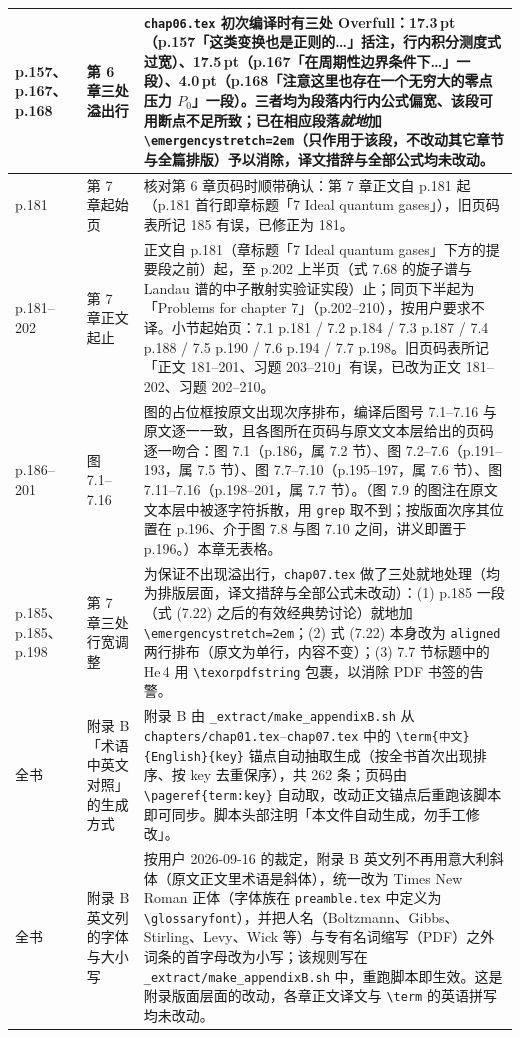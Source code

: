\documentclass[11pt,a4paper,oneside,fontset=fandol]{ctexart}
\begin{document}
\begin{longtable}{@{}p{3.4cm} p{3.4cm} p{7.4cm}@{}}
  \midrule
  p.157、p.167、p.168 & 第 6 章三处溢出行 & \texttt{chap06.tex} 初次编译时有三处 Overfull：17.3\,pt（p.157「这类变换也是正则的…」括注，行内积分测度式过宽）、17.5\,pt（p.167「在周期性边界条件下…」一段）、4.0\,pt（p.168「注意这里也存在一个无穷大的零点压力 $P_0$」一段）。三者均为段落内行内公式偏宽、该段可用断点不足所致；已在相应段落\emph{就地}加 \texttt{\textbackslash emergencystretch=2em}（只作用于该段，不改动其它章节与全篇排版）予以消除，译文措辞与全部公式均未改动。\\
  \midrule
  p.181 & 第 7 章起始页 & 核对第 6 章页码时顺带确认：第 7 章正文自 p.181 起（p.181 首行即章标题「7 Ideal quantum gases」），旧页码表所记 185 有误，已修正为 181。\\
  \midrule
  p.181--202 & 第 7 章正文起止 & 正文自 p.181（章标题「7 Ideal quantum gases」下方的提要段之前）起，至 p.202 上半页（式 7.68 的旋子谱与 Landau 谱的中子散射实验证实段）止；同页下半起为「Problems for chapter 7」（p.202--210），按用户要求不译。小节起始页：7.1 p.181 / 7.2 p.184 / 7.3 p.187 / 7.4 p.188 / 7.5 p.190 / 7.6 p.194 / 7.7 p.198。旧页码表所记「正文 181--201、习题 203--210」有误，已改为正文 181--202、习题 202--210。\\
  \midrule
  p.186--201 & 图 7.1--7.16 & 图的占位框按原文出现次序排布，编译后图号 7.1--7.16 与原文逐一一致，且各图所在页码与原文文本层给出的页码逐一吻合：图 7.1（p.186，属 7.2 节）、图 7.2--7.6（p.191--193，属 7.5 节）、图 7.7--7.10（p.195--197，属 7.6 节）、图 7.11--7.16（p.198--201，属 7.7 节）。（图 7.9 的图注在原文文本层中被逐字符拆散，用 \texttt{grep} 取不到；按版面次序其位置在 p.196、介于图 7.8 与图 7.10 之间，讲义即置于 p.196。）本章无表格。\\
  \midrule
  p.185、p.185、p.198 & 第 7 章三处行宽调整 & 为保证不出现溢出行，\texttt{chap07.tex} 做了三处就地处理（均为排版层面，译文措辞与全部公式未改动）：(1) p.185 一段（式 (7.22) 之后的有效经典势讨论）就地加 \texttt{\textbackslash emergencystretch=2em}；(2) 式 (7.22) 本身改为 \texttt{aligned} 两行排布（原文为单行，内容不变）；(3) 7.7 节标题中的 He\,4 用 \texttt{\textbackslash texorpdfstring} 包裹，以消除 PDF 书签的告警。\\
  \midrule
  全书 & 附录 B「术语中英文对照」的生成方式 & 附录 B 由 \texttt{\_extract/make\_appendixB.sh} 从 \texttt{chapters/chap01.tex}--\texttt{chap07.tex} 中的 \texttt{\textbackslash term\{中文\}\{English\}\{key\}} 锚点自动抽取生成（按全书首次出现排序、按 key 去重保序），共 262 条；页码由 \texttt{\textbackslash pageref\{term:key\}} 自动取，改动正文锚点后重跑该脚本即可同步。脚本头部注明「本文件自动生成，勿手工修改」。\\
  \midrule
  全书 & 附录 B 英文列的字体与大小写 & 按用户 2026-09-16 的裁定，附录 B 英文列不再用意大利斜体（原文正文里术语是斜体），统一改为 Times New Roman 正体（字体族在 \texttt{preamble.tex} 中定义为 \texttt{\textbackslash glossaryfont}），并把人名（Boltzmann、Gibbs、Stirling、Levy、Wick 等）与专有名词缩写（PDF）之外词条的首字母改为小写；该规则写在 \texttt{\_extract/make\_appendixB.sh} 中，重跑脚本即生效。这是附录版面层面的改动，各章正文译文与 \texttt{\textbackslash term} 的英语拼写均未改动。\\
  \bottomrule
\end{longtable}
\end{document}
